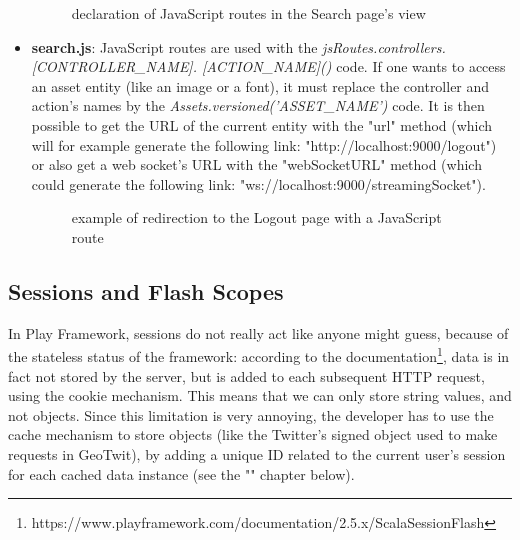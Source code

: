 \documentclass[a4paper,11pt]{report}
\begin{document}
\begin{itemize}
	\begin{figure}[H]
	\vspace{-5pt}
	\begin{center}
	\vspace{-5pt}
	\caption{declaration of JavaScript routes in the Search page's view}
	\end{center}
	\end{figure}
	\vspace{-20pt}
	\item \textbf{search.js}: JavaScript routes are used with the \emph{jsRoutes.controllers.[CONTROLLER\_NAME]. [ACTION\_NAME]()} code. If one wants to access an asset entity (like an image or a font), it must replace the controller and action's names by the \emph{Assets.versioned('ASSET\_NAME')} code. It is then possible to get the URL of the current entity with the "url" method (which will for example generate the following link: "http://localhost:9000/logout") or also get a web socket's URL with the "webSocketURL" method (which could generate the following link: "ws://localhost:9000/streamingSocket").
	\begin{figure}[H]
	\vspace{-5pt}
	\begin{center}
	\vspace{-5pt}
	\caption{example of redirection to the Logout page with a JavaScript route}
	\end{center}
	\end{figure}
\end{itemize}


\subsection{Sessions and Flash Scopes}
\label{sessionsAndFlashScopes}
In Play Framework, sessions do not really act like anyone might guess, because of the stateless status of the framework: according to the documentation\footnote{https://www.playframework.com/documentation/2.5.x/ScalaSessionFlash}, data is in fact not stored by the server, but is added to each subsequent HTTP request, using the cookie mechanism. This means that we can only store string values, and not objects. Since this limitation is very annoying, the developer has to use the cache mechanism to store objects (like the Twitter's signed object used to make requests in GeoTwit), by adding a unique ID related to the current user's session for each cached data instance (see the "" chapter below).\\
\end{document}
